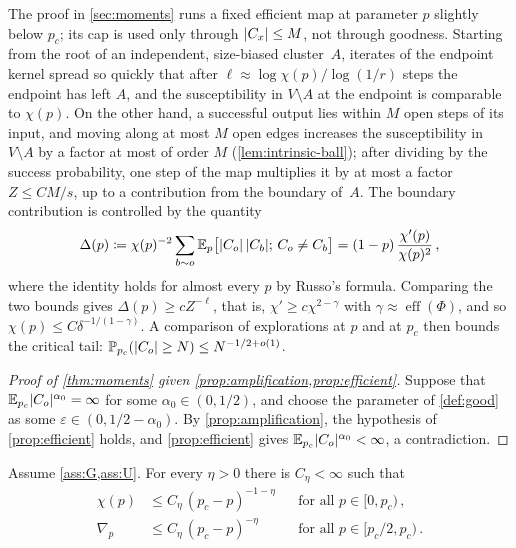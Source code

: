 The proof in \cref{sec:moments} runs a fixed efficient map at parameter $p$ slightly below $p_c$; its
cap is used only through $\lvert C_x\rvert\le M$, not through goodness. Starting from the root of an
independent, size-biased cluster~$A$, iterates of the endpoint kernel spread so quickly that after
$\ell\approx\log\chi(p)/\log(1/r)$ steps the endpoint has left $A$, and the susceptibility in
$V\setminus A$ at the endpoint is comparable to $\chi(p)$. On the other hand, a successful output lies
within $M$ open steps of its input, and moving along at most $M$ open edges increases the
susceptibility in $V\setminus A$ by a factor at most of order $M$ (\cref{lem:intrinsic-ball}); after
dividing by the success probability, one step of the map multiplies it by at most a factor $Z\le CM/s$,
up to a contribution from the boundary of~$A$. The boundary contribution is controlled by the quantity
\begin{equation*}
  \Delta(p)\coloneqq\chi(p)^{-2}\sum_{b\sim o}\mathbb E_p\bigl[\lvert C_o\rvert\,\lvert C_b\rvert;\,C_o\neq C_b\bigr]
  =(1-p)\,\frac{\chi'(p)}{\chi(p)^2}\,,
\end{equation*}
where the identity holds for almost every $p$ by Russo's formula. Comparing the two bounds gives
$\Delta(p)\ge cZ^{-\ell}$, that is, $\chi'\ge c\chi^{2-\gamma}$ with $\gamma\approx\operatorname{eff}(\Phi)$,
and so $\chi(p)\le C\delta^{-1/(1-\gamma)}$. A comparison of explorations at $p$ and at $p_c$ then bounds
the critical tail: $\mathbb P_{p_c}(\lvert C_o\rvert\ge N)\le N^{-1/2+o(1)}$.

\begin{proof}[Proof of \cref{thm:moments} given \cref{prop:amplification,prop:efficient}]
Suppose that $\mathbb E_{p_c}\lvert C_o\rvert^{\alpha_0}=\infty$ for some $\alpha_0\in(0,1/2)$, and choose the
parameter of \cref{def:good} as some $\varepsilon\in(0,1/2-\alpha_0)$. By \cref{prop:amplification}, the
hypothesis of \cref{prop:efficient} holds, and \cref{prop:efficient} gives
$\mathbb E_{p_c}\lvert C_o\rvert^{\alpha_0}<\infty$, a contradiction.
\end{proof}

\begin{theorem}\label{thm:apriori}
Assume \cref{ass:G,ass:U}. For every $\eta>0$ there is $C_\eta<\infty$ such that
\begin{align}
  \chi(p)&\le C_\eta\,(p_c-p)^{-1-\eta}&&\text{for all }p\in[0,p_c)\,,\label{eq:apriori-chi}\\
  \nabla_p&\le C_\eta\,(p_c-p)^{-\eta}&&\text{for all }p\in[p_c/2,p_c)\,.\label{eq:apriori-triangle}
\end{align}
\end{theorem}

